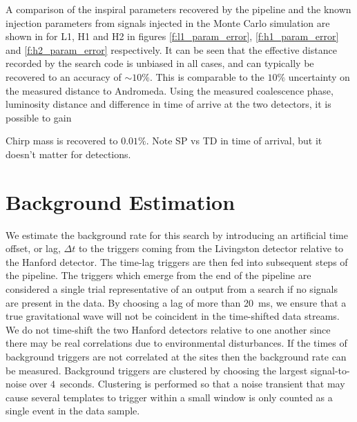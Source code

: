 A comparison of the inspiral parameters recovered by the pipeline and the
known injection parameters from signals injected in the Monte Carlo simulation
are shown in for L1, H1 and H2 in figures \ref{f:l1_param_error},
\ref{f:h1_param_error} and \ref{f:h2_param_error} respectively. It can be seen
that the effective distance recorded by the search code is unbiased in all
cases, and can typically be recovered to an accuracy of $\sim 10\%$. This is
comparable to the $10\%$ uncertainty on the measured distance to Andromeda.
Using the measured coalescence phase, luminosity distance and difference in
time of arrive at the two detectors, it is possible to gain 

Chirp mass is recovered to $0.01\%$. Note SP vs TD in time of arrival, but it
doesn't matter for detections.

\section{Background Estimation}
\label{s:s2background}

We estimate the background rate for this search by introducing an artificial
time offset, or {lag}, $\Delta t$ to the triggers coming from the Livingston
detector relative to the Hanford detector.  The time-lag triggers are then fed
into subsequent steps of the pipeline.  The triggers which emerge from the end
of the pipeline are considered a single trial representative of an output from
a search if no signals are present in the data.   By choosing a lag of more
than 20~ms, we ensure that a true gravitational wave will not be coincident in
the time-shifted data streams.  We do not time-shift the two Hanford detectors
relative to one another since there may be real correlations due to
environmental disturbances.  If the times of background triggers are not
correlated at the sites then the background rate can be measured. Background
triggers are clustered by choosing the largest signal-to-noise over
$4$~seconds. Clustering is performed so that a noise transient that may cause
several templates to trigger within a small window is only counted as a single
event in the data sample.

